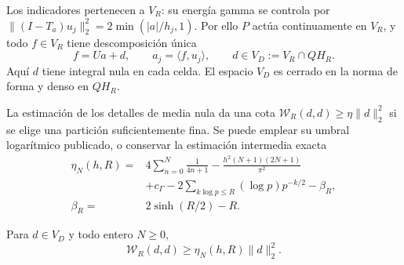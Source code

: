 Los indicadores pertenecen a \(V_R\): su energía gamma se controla por
\(\|(I-T_a)u_j\|_2^2=2\min(|a|/h_j,1)\). Por ello \(P\) actúa
continuamente en \(V_R\), y todo \(f\in V_R\) tiene descomposición única
\begin{equation}
f=Ua+d,\qquad a_j=\langle f,u_j\rangle,\qquad
d\in V_D:=V_R\cap QH_R.
\label{viii:schur-add-display-4}
\end{equation}
Aquí \(d\) tiene integral nula en cada celda. El espacio \(V_D\) es
cerrado en la norma de forma y denso en \(QH_R\).

La estimación de los detalles de media nula da una cota \(\mathscr W_R(d,d)\geq\eta\|d\|_2^2\)
si se elige una partición suficientemente fina. Se puede emplear su
umbral logarítmico publicado, o conservar la estimación intermedia exacta
\begin{equation}
\begin{aligned}
\eta_N(h,R)={}&4\sum_{n=0}^N\frac1{4n+1}
-\frac{h^2(N+1)(2N+1)}{\pi^2}\\
&+c_\Gamma-2\sum_{k\log p\leq R}(\log p)p^{-k/2}-\beta_R,\\
\beta_R={}&2\sinh(R/2)-R.
\end{aligned}
\label{viii:schur-add-eq-S1}
\end{equation}
\begin{lemma}
\label{viii:schur-add-retencion-detalles}
Para \(d\in V_D\) y todo entero \(N\geq0\),
\[
\mathscr W_R(d,d)\geq\eta_N(h,R)\|d\|_2^2.
\]
\end{lemma}
